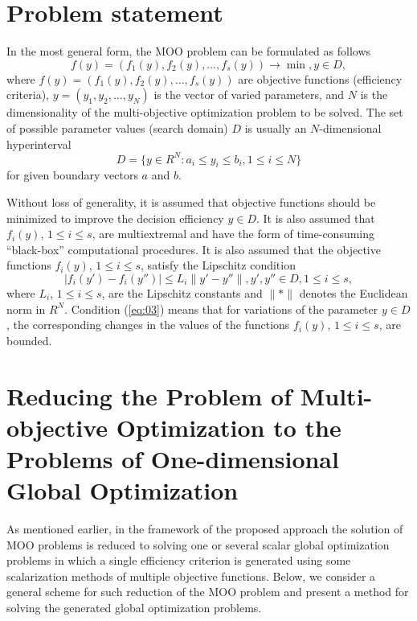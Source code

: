 \documentclass[runningheads]{llncs}
\begin{document}
\section{Problem statement} \label{sec:02}

In the most general form, the MOO problem can be formulated as follows
\begin{equation}
\label{eq:01}
f(y) = (f_1(y), f_2(y), \dots, f_s(y)) \to \min,  y\in D,
\end{equation}
where $f(y) = (f_1(y), f_2(y), \dots, f_s(y))$ are objective functions (efficiency criteria), $y = (y_1, y_2, \dots , y_N)$ is the vector of varied parameters, and $N$ is the dimensionality of the multi-objective optimization problem to be solved. The set of possible parameter values (search domain) $D$ is usually an $N$-dimensional hyperinterval
\begin{equation}
\label{eq:02}
D  = \{ y\in R^N: a_i \leq y_i \leq b_i, 1 \leq i \leq N \}
\end{equation}
for given boundary vectors $a$ and $b$.

Without loss of generality, it is assumed that objective functions should be minimized to improve the decision efficiency $y \in D$. It is also assumed that $f_i(y)$, $1 \leq i \leq s$, are multiextremal and have the form of time-consuming ``black-box'' computational procedures. It is also assumed that the objective functions $f_i(y)$, $1 \leq i \leq s$, satisfy the Lipschitz condition 
\begin{equation}
\label{eq:03}
|f_i(y') - f_i(y'')| \leq L_i\|y' - y''\|, y', y'' \in D, 1 \leq i \leq s,
\end{equation}
where $L_i$, $1 \leq i \leq s$, are the Lipschitz constants and $\|*\|$ denotes the Euclidean norm in $R^N$.  Condition (\ref{eq:03}) means that for variations of the parameter $y \in D$, the corresponding changes in the values of the functions $f_i(y)$, $1 \leq i \leq s$, are bounded. 

\section{Reducing the Problem of Multi-objective Optimization to the Problems of One-dimensional Global Optimization} \label{sec:03}

As mentioned earlier, in the framework of the proposed approach the solution of MOO problems is reduced to solving one or several scalar global optimization problems in which a single efficiency criterion is generated using some scalarization methods of multiple objective functions. Below, we consider a general scheme for such reduction of the MOO problem and present a method for solving the generated global optimization problems.
\end{document}
